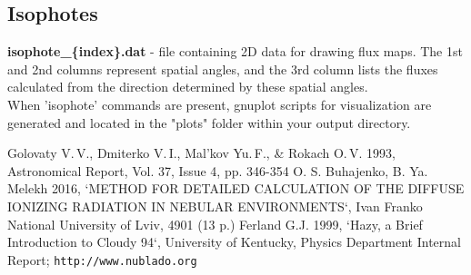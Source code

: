 \documentclass[a4paper]{article}
\begin{document}
\subsection{Isophotes}

{\bf isophote\_\{index\}.dat} - file containing 2D data for drawing flux maps.
The 1st and 2nd columns represent spatial angles, and the 3rd column lists the fluxes calculated from the direction determined by these spatial angles. \\

When 'isophote' commands are present, gnuplot scripts for visualization are generated and located in the "plots"
folder within your output directory.


\begin{thebibliography}{3}
{\small
{} Golovaty V.\,V., Dmiterko V.\,I., Mal'kov Yu.\,F., \& Rokach O.\,V. 1993, Astronomical Report, Vol. 37, Issue 4, pp. 346-354
 O. S. Buhajenko, B. Ya. Melekh 2016, `METHOD FOR DETAILED CALCULATION OF THE DIFFUSE IONIZING RADIATION IN NEBULAR ENVIRONMENTS`, Ivan Franko National University of Lviv, 4901 (13 p.) 
 Ferland G.J. 1999, `Hazy, a Brief Introduction to Cloudy 94`, University of Kentucky, Physics Department Internal Report; \texttt{http://www.nublado.org}
}
\end{thebibliography}
\end{document}
